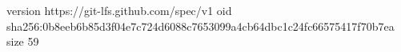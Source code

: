 version https://git-lfs.github.com/spec/v1
oid sha256:0b8eeb6b85d3f04e7c724d6088c7653099a4cb64dbc1c24fc66575417f70b7ea
size 59
